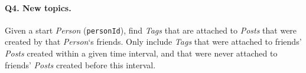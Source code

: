 \paragraph{\textbf{Q4}. New topics.}
Given a start \emph{Person} (\texttt{personId}), find \emph{Tags} that
are attached to \emph{Posts} that were created by that \emph{Person}`s
friends. Only include \emph{Tags} that were attached to friends'
\emph{Posts} created within a given time interval, and that were never
attached to friends' \emph{Posts} created before this interval.

